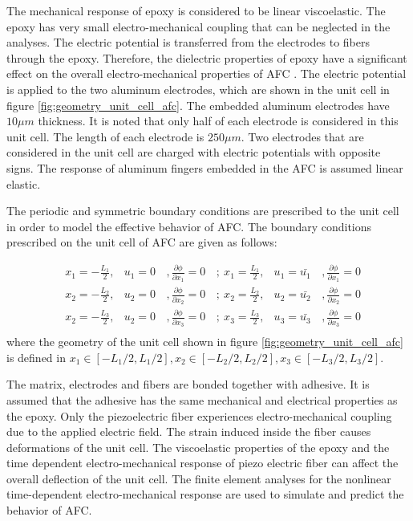 The mechanical response of epoxy is considered to be linear viscoelastic.
The epoxy has very small electro-mechanical coupling that can be neglected in the analyses.
The electric potential is transferred from the electrodes to fibers through the epoxy.
Therefore, the dielectric properties of epoxy have a significant effect on the overall electro-mechanical properties of AFC \cite{atitallah2014parametric}. 
The electric potential is applied to the two aluminum electrodes, which are shown in the unit cell in figure \ref{fig:geometry_unit_cell_afc}.
The embedded aluminum electrodes have $10 \mu m$ thickness.
It is noted that only half of each electrode is considered in this unit cell.
The length of each electrode is $250 \mu m$.
Two electrodes that are considered in the unit cell are charged with electric potentials with opposite signs.
The response of aluminum fingers embedded in the AFC is assumed linear elastic.

The periodic and symmetric boundary conditions are prescribed to the unit cell in order to model the effective behavior of AFC. 
The boundary conditions prescribed on the unit cell of AFC are given as follows:

\begin{equation}
\begin{aligned} 
& x_1=-\frac{L_1}{2}  ,& u_1=0 &\, , \frac{\partial \phi}{\partial x_1}=0        &\, ; \ x_1= \frac{L_1}{2}  ,& u_1=\bar{u_1} &\, ,  \frac{\partial \phi}{\partial x_1}=0   \\ 
& x_2=-\frac{L_2}{2}  ,& u_2=0 &\, , \frac{\partial \phi}{\partial x_2}=0        &\, ; \ x_2= \frac{L_2}{2}  ,& u_2=\bar{u_2} &\, ,  \frac{\partial \phi}{\partial x_2}=0   \\ 
& x_2=-\frac{L_3}{2}  ,& u_2=0 &\, , \frac{\partial \phi}{\partial x_3}=0        &\, ; \ x_3= \frac{L_3}{2}  ,& u_3=\bar{u_3} &\, , \frac{\partial \phi}{\partial x_3}=0    \\
\end{aligned}
\end{equation}
where the geometry of the unit cell shown in figure \ref{fig:geometry_unit_cell_afc} is defined in $x_1 \in [-L_1/2,L_1/2], x_2 \in [-L_2/2,L_2/2], x_3 \in [-L_3/2,L_3/2]$.
 

The matrix, electrodes and fibers are bonded together with adhesive. 
It is assumed that the adhesive has the same mechanical and electrical properties as the epoxy.
Only the piezoelectric fiber experiences electro-mechanical coupling due to the applied electric field.
The strain induced inside the fiber causes deformations of the unit cell.
The viscoelastic properties of the epoxy and the time
 dependent electro-mechanical response of piezo electric fiber can affect the overall deflection of the unit cell.
The finite element analyses for the nonlinear time-dependent electro-mechanical response are used to simulate and predict the behavior of AFC. 


